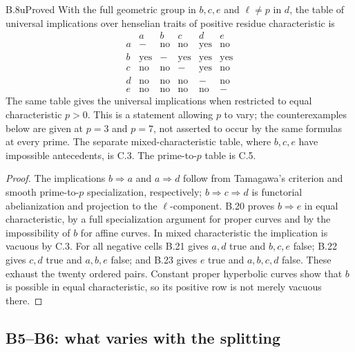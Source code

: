 \begin{claim}{B.8u}{Proved}
With the full geometric group in $b,c,e$ and $\ell\ne p$ in $d$, the
table of universal implications over henselian traits of positive residue
characteristic is
\[
\begin{array}{c|ccccc}
 &a&b&c&d&e\\\hline
a&-&\mathrm{no}&\mathrm{no}&\mathrm{yes}&\mathrm{no}\\
b&\mathrm{yes}&-&\mathrm{yes}&\mathrm{yes}&\mathrm{yes}\\
c&\mathrm{no}&\mathrm{no}&-&\mathrm{yes}&\mathrm{no}\\
d&\mathrm{no}&\mathrm{no}&\mathrm{no}&-&\mathrm{no}\\
e&\mathrm{no}&\mathrm{no}&\mathrm{no}&\mathrm{no}&-
\end{array}
\]
The same table gives the universal implications when restricted to equal
characteristic $p>0$. This is a statement allowing $p$ to vary; the
counterexamples below are given at $p=3$ and $p=7$, not asserted to
occur by the same formulas at every prime. The separate
mixed-characteristic table, where $b,c,e$ have impossible antecedents,
is C.3. The prime-to-$p$ table is C.5.
\end{claim}
\begin{proof}
The implications $b\Rightarrow a$ and $a\Rightarrow d$ follow from
Tamagawa's criterion and smooth prime-to-$p$ specialization, respectively;
$b\Rightarrow c\Rightarrow d$ is functorial abelianization and projection
to the $\ell$-component. B.20 proves $b\Rightarrow e$ in equal
characteristic, by a full specialization argument for proper curves and
by the impossibility of $b$ for affine curves. In mixed characteristic
the implication is vacuous by C.3.
For all negative cells B.21 gives $a,d$ true and $b,c,e$ false;
B.22 gives $c,d$ true and $a,b,e$ false; and B.23 gives $e$ true and
$a,b,c,d$ false. These exhaust the twenty ordered pairs. Constant proper
hyperbolic curves show that $b$ is possible in equal characteristic,
so its positive row is not merely vacuous there.
\end{proof}

\subsection{B5--B6: what varies with the splitting}

